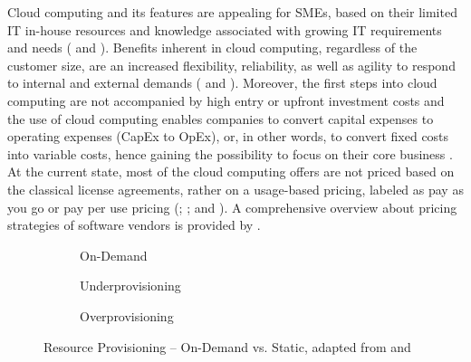 Cloud computing and its features are appealing for \acp{SME}, based on their limited \ac{IT} in-house resources and knowledge associated with growing \ac{IT} requirements and needs (\citealp[p. 398]{Weinhardt2009} and \citealp{Karabek2011}). Benefits inherent in cloud computing, regardless of the customer size, are an increased flexibility, reliability, as well as agility to respond to internal and external demands (\citealp[p. 51]{Vaquero2009} and \citealp[p. 129]{Iyer2010}). Moreover, the first steps into cloud computing are not accompanied by high entry or upfront investment costs and the use of cloud computing enables companies to convert capital expenses to operating expenses (CapEx to OpEx), or, in other words, to convert fixed costs into variable costs, hence gaining the possibility to focus on their core business \citep[pp. 51-53]{Armbrust2010}. At the current state, most of the cloud computing offers are not priced based on the classical license agreements, rather on a usage-based pricing, labeled as pay as you go or pay per use pricing (\citealp[pp. 50-54]{Vaquero2009}; \citealp[pp. 51-53,58]{Armbrust2010}; and \citealp[p. 2]{Iyer2010}). A comprehensive overview about pricing strategies of software vendors is provided by \citet{Lehmann2009}.

\begin{figure}[t]
	\centering
	\begin{subfigure}{.75\textwidth}
		\centering
		
		\caption{On-Demand}\label{fig:rpc}
	\end{subfigure}
	\begin{subfigure}[b]{.75\textwidth}
		\centering
		
		\caption{Underprovisioning}\label{fig:rpu}
	\end{subfigure}
	\begin{subfigure}[b]{.75\textwidth}
		\centering
		
		\caption{Overprovisioning}\label{fig:rpo}
	\end{subfigure}
	\caption[Resource Provisioning -- On-Demand vs. Static]{Resource Provisioning -- On-Demand vs. Static, adapted from \citet[p. 54]{Armbrust2010} and \citet[p. 127]{Iyer2010}}
	\label{fig:rp}
\end{figure}

